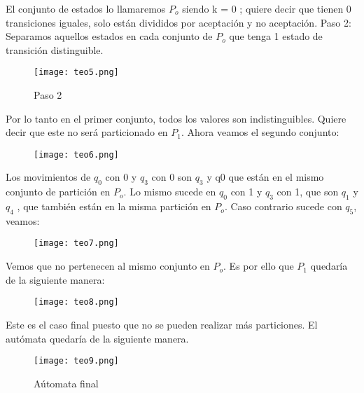 \documentclass[12pt]{article}
\begin{document}
El conjunto de estados lo llamaremos $P_o$ siendo k = 0 ; quiere decir que tienen 0 transiciones iguales, solo están divididos por aceptación y no aceptación.
\newpage
Paso 2: Separamos aquellos estados en cada conjunto de $P_o$ que tenga 1 estado de transición distinguible.

\begin{figure}[h]
    \centering
    \texttt{[image: teo5.png]}
    \caption{Paso 2}
    \label{fig:my_label}
\end{figure}

 Por lo tanto en el primer conjunto, todos los valores son indistinguibles. Quiere decir que este no será particionado en $P_1$. 
 Ahora veamos el segundo conjunto:

\begin{figure}[h]
    \centering
    \texttt{[image: teo6.png]}
    \caption{}
    \label{fig:my_label}
\end{figure}

Los movimientos de $q_0$ con 0 y $q_3$ con 0 son $q_3$ y q0 que están en el mismo conjunto de partición en $P_o$. Lo mismo sucede en $q_0$ con 1 y $q_3$ con 1, que son $q_1$ y $q_4$ , que también están en la misma partición en $P_o$.
Caso contrario sucede con $q_5$, veamos:

\begin{figure}[h]
    \centering
    \texttt{[image: teo7.png]}
    \caption{}
    \label{fig:my_label}
\end{figure}

Vemos que no pertenecen al mismo conjunto en $P_o$. Es por ello que $P_1$ quedaría de la siguiente manera:

\begin{figure}[h]
    \centering
    \texttt{[image: teo8.png]}
\end{figure}    


\newpage
Este es el caso final puesto que no se pueden realizar más particiones. El autómata quedaría de la siguiente manera.

\begin{figure}[h]
    \centering
    \texttt{[image: teo9.png]}
    \caption{A\'utomata final}
    \label{fig:my_label}
\end{figure}
\end{document}
